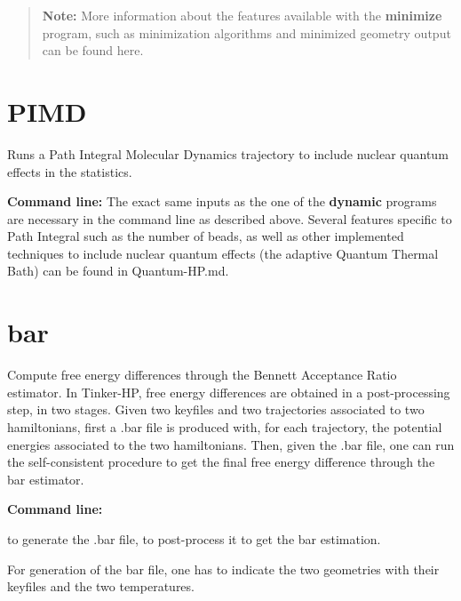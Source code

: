\begin{quotation}
{\bfseries Note\-:} More information about the features available with the {\bfseries minimize} program, such as minimization algorithms and minimized geometry output can be found here.

\end{quotation}
\hypertarget{tinker_hp_suite_program_pimd}{}\section{P\-I\-M\-D}\label{tinker_hp_suite_program_pimd}
Runs a Path Integral Molecular Dynamics trajectory to include nuclear quantum effects in the statistics.
\begin{DoxyItemize}
\item {\bfseries Command line\-:} The exact same inputs as the one of the {\bfseries dynamic} programs are necessary in the command line as described above. Several features specific to Path Integral such as the number of beads, as well as other implemented techniques to include nuclear quantum effects (the adaptive Quantum Thermal Bath) can be found in {\ttfamily Quantum-\/\-H\-P.\-md}.
\end{DoxyItemize}\hypertarget{tinker_hp_suite_program_bar}{}\section{bar}\label{tinker_hp_suite_program_bar}
Compute free energy differences through the Bennett Acceptance Ratio estimator. In Tinker-\/\-H\-P, free energy differences are obtained in a post-\/processing step, in two stages. Given two keyfiles and two trajectories associated to two hamiltonians, first a {\ttfamily .bar} file is produced with, for each trajectory, the potential energies associated to the two hamiltonians. Then, given the {\ttfamily .bar} file, one can run the self-\/consistent procedure to get the final free energy difference through the bar estimator.


\begin{DoxyItemize}
\item {\bfseries Command line\-:}
\begin{DoxyItemize}
\item {} to generate the {\ttfamily .bar} file, {} to post-\/process it to get the bar estimation.
\item For generation of the bar file, one has to indicate the two geometries with their keyfiles and the two temperatures.
\end{DoxyItemize}
\end{DoxyItemize}

